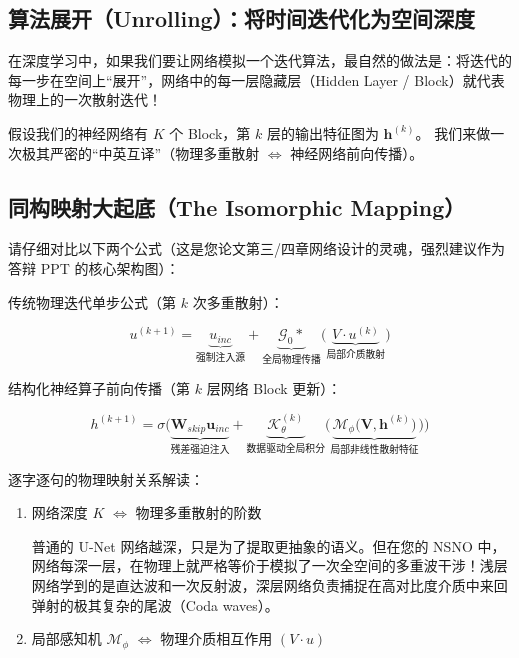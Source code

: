 \documentclass[12pt]{article}
\begin{document}
{\subsection{算法展开（Unrolling）：将时间迭代化为空间深度}

在深度学习中，如果我们要让网络模拟一个迭代算法，最自然的做法是：将迭代的每一步在空间上“展开”，网络中的每一层隐藏层（Hidden Layer / Block）就代表物理上的一次散射迭代！

假设我们的神经网络有 $K$ 个 Block，第 $k$ 层的输出特征图为 $\mathbf{h}^{(k)}$。
我们来做一次极其严密的“中英互译”（物理多重散射 $\iff$ 神经网络前向传播）。

\subsection{同构映射大起底（The Isomorphic Mapping）}

请仔细对比以下两个公式（这是您论文第三/四章网络设计的灵魂，强烈建议作为答辩 PPT 的核心架构图）：

传统物理迭代单步公式（第 $k$ 次多重散射）：

\begin{equation}
u^{(k+1)}
=
\underbrace{u_{inc}}_{\text{强制注入源}}
+
\underbrace{\mathcal{G}_0 *}_{\text{全局物理传播}}
\Big(
\underbrace{V \cdot u^{(k)}}_{\text{局部介质散射}}
\Big)
\label{eq:7-2}
\end{equation}

结构化神经算子前向传播（第 $k$ 层网络 Block 更新）：

\begin{equation}
h^{(k+1)}
=
\sigma \Bigg(
\underbrace{\mathbf{W}_{skip} \mathbf{u}_{inc}}_{\text{残差强迫注入}}
+
\underbrace{\mathcal{K}_{\theta}^{(k)}}_{\text{数据驱动全局积分}}
\Big(
\underbrace{\mathcal{M}_{\phi}\big(\mathbf{V}, \mathbf{h}^{(k)}\big)}_{\text{局部非线性散射特征}}
\Big)
\Bigg)
\label{eq:7-3}
\end{equation}

逐字逐句的物理映射关系解读：

\begin{enumerate}[leftmargin=2em]
    \item 网络深度 $K$ $\iff$ 物理多重散射的阶数

    普通的 U-Net 网络越深，只是为了提取更抽象的语义。但在您的 NSNO 中，网络每深一层，在物理上就严格等价于模拟了一次全空间的多重波干涉！浅层网络学到的是直达波和一次反射波，深层网络负责捕捉在高对比度介质中来回弹射的极其复杂的尾波（Coda waves）。

    \item 局部感知机 $\mathcal{M}_{\phi}$ $\iff$ 物理介质相互作用 $(V \cdot u)$


\end{enumerate}}
\end{document}
